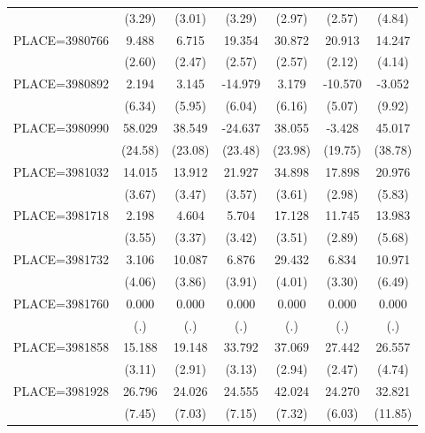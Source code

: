 {\begin{tabular}{l*{6}{c}}
                    &      (3.29)&      (3.01)&      (3.29)&      (2.97)&      (2.57)&      (4.84)\\
PLACE=3980766       &       9.488&       6.715&      19.354&      30.872&      20.913&      14.247\\
                    &      (2.60)&      (2.47)&      (2.57)&      (2.57)&      (2.12)&      (4.14)\\
PLACE=3980892       &       2.194&       3.145&     -14.979&       3.179&     -10.570&      -3.052\\
                    &      (6.34)&      (5.95)&      (6.04)&      (6.16)&      (5.07)&      (9.92)\\
PLACE=3980990       &      58.029&      38.549&     -24.637&      38.055&      -3.428&      45.017\\
                    &     (24.58)&     (23.08)&     (23.48)&     (23.98)&     (19.75)&     (38.78)\\
PLACE=3981032       &      14.015&      13.912&      21.927&      34.898&      17.898&      20.976\\
                    &      (3.67)&      (3.47)&      (3.57)&      (3.61)&      (2.98)&      (5.83)\\
PLACE=3981718       &       2.198&       4.604&       5.704&      17.128&      11.745&      13.983\\
                    &      (3.55)&      (3.37)&      (3.42)&      (3.51)&      (2.89)&      (5.68)\\
PLACE=3981732       &       3.106&      10.087&       6.876&      29.432&       6.834&      10.971\\
                    &      (4.06)&      (3.86)&      (3.91)&      (4.01)&      (3.30)&      (6.49)\\
PLACE=3981760       &       0.000&       0.000&       0.000&       0.000&       0.000&       0.000\\
                    &         (.)&         (.)&         (.)&         (.)&         (.)&         (.)\\
PLACE=3981858       &      15.188&      19.148&      33.792&      37.069&      27.442&      26.557\\
                    &      (3.11)&      (2.91)&      (3.13)&      (2.94)&      (2.47)&      (4.74)\\
PLACE=3981928       &      26.796&      24.026&      24.555&      42.024&      24.270&      32.821\\
                    &      (7.45)&      (7.03)&      (7.15)&      (7.32)&      (6.03)&     (11.85)\\

\end{tabular}}
